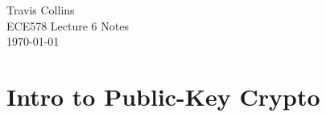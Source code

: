 \documentclass[12pt,letterpaper]{article}
\begin{document}
\linespread{1} %
\small \normalsize %
\begin{flushright}
Travis Collins \\
ECE578 Lecture 6 Notes \\
\today
\end{flushright}

\section{Intro to Public-Key Crypto}
\end{document}
